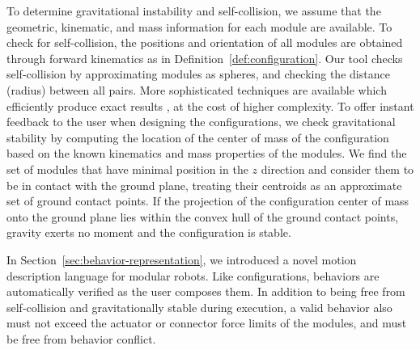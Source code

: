 \documentclass[graybox]{svmult}
\begin{document}
To determine gravitational instability and
self-collision, we assume that the geometric, kinematic, and mass
information for each module are available. 
%
To check for self-collision, the positions and orientation of all modules are
obtained  through forward kinematics as in Definition~\ref{def:configuration}.
Our tool checks self-collision by
approximating modules as spheres, and checking the distance (radius) between all
pairs. More sophisticated techniques are available which efficiently produce
exact results \cite{pan2012fcl}, at the cost of higher complexity.
%
To offer instant feedback to the user when designing the configurations, we
 check gravitational stability by computing the location of the center of
mass of the configuration based on the known kinematics and mass properties of 
the modules.
%
We find the set of modules that have minimal position in the $z$ direction and consider them to
be in contact with the ground plane, treating their centroids as an approximate
set of ground contact points.
If the projection of the configuration center of mass onto the ground plane
lies within the convex hull of the ground contact points, gravity exerts no
moment and the configuration
is stable.

In Section~\ref{sec:behavior-representation}, we introduced a novel motion description language for modular robots. Like
configurations, behaviors are automatically verified as the user composes them.
  In addition to being free from self-collision and gravitationally stable during
execution, a valid behavior also must not exceed the actuator or connector force
limits of the modules, and must be free from behavior conflict.
% 
\end{document}
